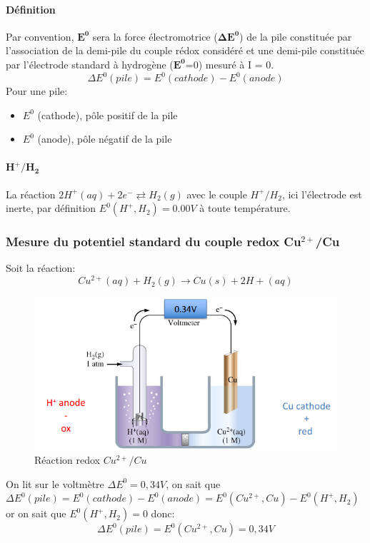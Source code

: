 \documentclass[10pt,a4paper]{book}
\begin{document}
\paragraph{Définition} Par convention, $\mathbf{E^0}$ sera la force électromotrice ($\mathbf{\Delta E^0}$) de la pile constituée par l’association de la demi-pile du couple rédox considéré et une demi-pile constituée par l’électrode standard à hydrogène ($\mathbf{E^0}$=0) mesuré à I = 0.
\begin{displaymath}
\Delta E^0 (pile) = E^0 (cathode) - E^0 (anode)
\end{displaymath}
Pour une pile:
\begin{itemize}
\item $E^0$ (cathode), pôle positif de la pile
\item $E^0$ (anode), pôle négatif de la pile
\end{itemize}

\paragraph{$\mathbf{H^+/H_2}$} La réaction \(2H^+ (aq) + 2e^- \rightleftarrows H_2(g)\) avec le couple $H^+/H_2$, ici l'électrode est inerte, par définition $E^0(H^+, H_2) = 0.00V$ à toute température.

\subsubsection{Mesure du potentiel standard du couple redox \texorpdfstring{Cu$^{2+}$}{Cu2+}/Cu}
Soit la réaction:
\begin{displaymath}
Cu^{2+} (aq) + H_2 (g) → Cu(s) + 2H + (aq)
\end{displaymath}
\begin{figure}[h!]
\begin{center}
\includegraphics[scale=0.75]{./assets/redox_electro_example.png}
\end{center}
\caption{Réaction redox $Cu^{2+}/Cu$ }
\label{fig:example_redox}
\end{figure}
On lit sur le voltmètre $\Delta E^0 = 0,34V$, on sait que \(\Delta E^0 (pile) = E^0 (cathode) - E^0 (anode) = E^0 (Cu^{2+}, Cu) - E^0 (H^+, H_2)\) or on sait que \(E^0 (H^+, H_2) = 0\) donc:
\[\Delta E^0 (pile) = E^0 (Cu^{2+}, Cu) = 0,34V\]
\end{document}
